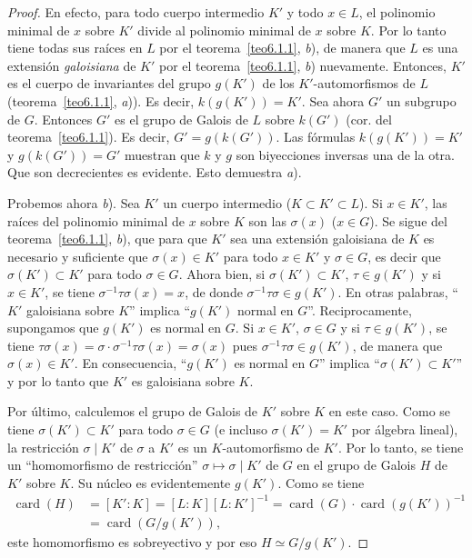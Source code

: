 \documentclass[10pt,oneside,bibtotoc,smallheadings,leqno,a5paper,DIV=12]{scrbook}
\newcommand{\QED}{}%
\DeclareMathOperator{\card}{card}
\numberwithin{equation}{section}
\theoremstyle{defi}
\theoremstyle{enonce}
\theoremstyle{rem}
\numberwithin{theorem}{section}
\numberwithin{proposition}{section}
\numberwithin{definition}{section}
\numberwithin{lemma}{section}
\numberwithin{corollary}{section}
\numberwithin{example}{section}
\numberwithin{footnote}{section}%
\begin{document}
\begin{proof}
En efecto, para todo cuerpo intermedio $K'$ y todo $x\in L$, el polinomio minimal de $x$
sobre $K'$ divide
al polinomio minimal de $x$ sobre $K$. Por lo tanto tiene todas sus ra\'ices en $L$ por
el teorema~\ref{teo6.1.1}, {\itshape b}),
de manera que $L$ es una extensi\'on {\em galoisiana} de $K'$ por el teorema~\ref{teo6.1.1},
{\itshape b}) nuevamente.
Entonces, $K'$ es el cuerpo de invariantes del grupo $g(K')$ de los $K'$-automorfismos de $L$
(teorema~\ref{teo6.1.1}, {\itshape a})). Es decir, $k(g(K')) = K'$. Sea ahora $G'$
un subgrupo de $G$. Entonces
$G'$ es el grupo de Galois de $L$ sobre $k(G')$ (cor. del teorema~\ref{teo6.1.1}).
Es decir, $G' = g(k(G'))$.
Las f\'ormulas $k(g(K')) = K'$ y $g(k(G')) = G'$ muestran que $k$ y $g$ son biyecciones 
inversas una de la otra.
Que son decrecientes es evidente. Esto demuestra {\itshape a}).

Probemos ahora {\itshape b}). Sea $K'$ un cuerpo intermedio ($K\subset K'\subset L$). Si $x\in K'$, las
ra\'ices del polinomio minimal de $x$ sobre $K$ son las $\sigma(x)$ ($x\in G$). Se sigue
del teorema~\ref{teo6.1.1}, {\itshape b}),
que para que $K'$ sea una extensi\'on galoisiana de $K$ es necesario y suficiente
que $\sigma(x)\in K'$
para todo $x\in K'$ y $\sigma\in G$, es decir que $\sigma(K')\subset K'$ para
todo $\sigma\in G$. Ahora bien,
si $\sigma(K')\subset K'$, $\tau\in g(K')$ y si $x\in K'$, se tiene
$\sigma^{-1}\tau\sigma(x) = x$, de donde
$\sigma^{-1}\tau\sigma\in g(K')$. En otras palabras, ``$K'$ galoisiana sobre $K$''
implica ``$g(K')$ normal
en $G$''. Reciprocamente, supongamos que $g(K')$ es normal en $G$. Si $x\in K'$,
$\sigma\in G$ y si
$\tau\in g(K')$, se tiene
$\tau\sigma(x) = \sigma\cdot\sigma^{-1}\tau\sigma(x) = \sigma(x)$ pues
$\sigma^{-1}\tau\sigma\in g(K')$, de manera que $\sigma(x) \in K'$.
En consecuencia, ``$g(K')$ es normal
en $G$'' implica ``$\sigma(K')\subset K'$'' y por lo tanto que $K'$ es galoisiana sobre $K$.

Por \'ultimo, calculemos el grupo de Galois de $K'$ sobre $K$ en este caso. Como se
tiene $\sigma(K')\subset K'$
para todo $\sigma\in G$ (e incluso $\sigma(K') = K'$ por \'algebra lineal), la restricci\'on
$\sigma\mid K'$ de $\sigma$ a $K'$ es un $K$-automorfismo de $K'$. Por lo tanto, se tiene un
``homomorfismo de restricci\'on'' $\sigma\mapsto\sigma\mid K'$ de $G$ en el grupo de
Galois $H$ de $K'$ sobre $K$.
Su n\'ucleo es evidentemente $g(K')$. Como se tiene
\begin{align*}
\card(H) &= [K':K]=[L:K][L:K']^{-1}=\card(G)\cdot\card(g(K'))^{-1}\\
&= \card(G/g(K')),
\end{align*}
este homomorfismo es sobreyectivo y por eso $H\simeq G/g(K')$. \QED
\end{proof}
\end{document}
